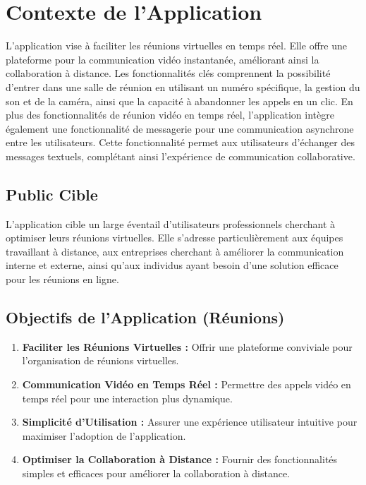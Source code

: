 \documentclass[12pt, a4paper, oneside]{Thesis}
\begin{document}
\section{Contexte de l'Application}
L'application vise à faciliter les réunions virtuelles en temps réel. Elle offre une plateforme pour la communication vidéo instantanée, améliorant ainsi la collaboration à distance. Les fonctionnalités clés comprennent la possibilité d'entrer dans une salle de réunion en utilisant un numéro spécifique, la gestion du son et de la caméra, ainsi que la capacité à abandonner les appels en un clic.
En plus des fonctionnalités de réunion vidéo en temps réel, l'application intègre également une fonctionnalité de messagerie pour une communication asynchrone entre les utilisateurs. Cette fonctionnalité permet aux utilisateurs d'échanger des messages textuels, complétant ainsi l'expérience de communication collaborative.

\subsection{Public Cible}
L'application cible un large éventail d'utilisateurs professionnels cherchant à optimiser leurs réunions virtuelles. Elle s'adresse particulièrement aux équipes travaillant à distance, aux entreprises cherchant à améliorer la communication interne et externe, ainsi qu'aux individus ayant besoin d'une solution efficace pour les réunions en ligne.

\subsection{Objectifs de l'Application (Réunions)}
\begin{enumerate}
    \item \textbf{Faciliter les Réunions Virtuelles :} Offrir une plateforme conviviale pour l'organisation de réunions virtuelles.
    \item \textbf{Communication Vidéo en Temps Réel :} Permettre des appels vidéo en temps réel pour une interaction plus dynamique.
    \item \textbf{Simplicité d'Utilisation :} Assurer une expérience utilisateur intuitive pour maximiser l'adoption de l'application.
    \item \textbf{Optimiser la Collaboration à Distance :} Fournir des fonctionnalités simples et efficaces pour améliorer la collaboration à distance.
\end{enumerate}
\end{document}
